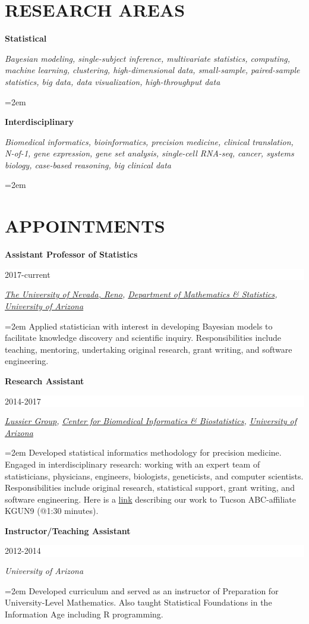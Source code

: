 \documentclass[paper=a4,fontsize=11pt]{scrartcl} %
\newcommand{\sepspace}{\vspace*{1em}}		%
\newcommand{\NewPart}[2]{\section*{\uppercase{#1} #2 }}
\newcommand{\EducationEntry}[4]{
		\noindent \textbf{#1} \hfill      %
		\colorbox{White}{%
			\parbox{6em}{%
			\hfill\color{Black}#2}} \par  %
		\noindent \textit{#3} \par        %
		\noindent\hangindent=2em\hangafter=0 \small #4 %
		\normalsize \par \vspace{-7pt}}
\begin{document}
\NewPart{Research areas}{}
\vspace{-7pt}

\EducationEntry{Statistical}{}{Bayesian modeling, single-subject inference, multivariate statistics, computing, machine learning, clustering, high-dimensional data, small-sample, paired-sample statistics, big data, data visualization, high-throughput data}{}

\EducationEntry{Interdisciplinary}{}{Biomedical informatics, bioinformatics, precision medicine, clinical translation, N-of-1, gene expression, gene set analysis, single-cell RNA-seq, cancer, systems biology, case-based reasoning, big clinical data}{}

\NewPart{Appointments}{}
\vspace{-7pt}

\EducationEntry{Assistant Professor of Statistics}{2017-current}{{\href{https://www.unr.edu/}{The University of Nevada, Reno}}, {\href{https://www.unr.edu/math/}{Department of Mathematics \& Statistics}}, {\href{http://www.arizona.edu/}{University of Arizona}}}{Applied statistician with interest in developing Bayesian models to facilitate knowledge discovery and scientific inquiry. Responsibilities include teaching, mentoring, undertaking original research, grant writing, and software engineering.}
\sepspace

\EducationEntry{Research Assistant}{2014-2017}{{\href{http://lussierlab.org/}{Lussier Group}}, {\href{http://cb2.uahs.arizona.edu/}{Center for Biomedical Informatics \& Biostatistics}}, {\href{http://www.arizona.edu/}{University of Arizona}}}{Developed statistical informatics methodology for precision medicine. Engaged in interdisciplinary research: working with an expert team of statisticians, physicians, engineers, biologists, geneticists, and computer scientists. Responsibilities include original research, statistical support, grant writing, and software engineering. Here is a \href{http://cb2.uahs.arizona.edu/news/dr-lussier-and-grant-schissler-speak-big-data-kgun9-local-news}{link} describing our work to Tucson ABC-affiliate KGUN9 (@1:30 minutes).}
\sepspace

\EducationEntry{Instructor/Teaching Assistant}{2012-2014}{University of Arizona}
{Developed curriculum and served as an instructor of Preparation for University-Level Mathematics. Also taught Statistical Foundations in the Information Age including \textsc{R} programming.}
\sepspace
\end{document}
